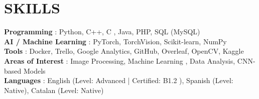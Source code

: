 \documentclass[letterpaper,11pt]{article}
\begin{document}
%
\section{SKILLS}
 \begin{itemize}[leftmargin=0in, label={}]
    \small{\item{
     \textbf{Programming} {: Python, C++, C , Java, PHP, SQL (MySQL)} \\
     \textbf{AI / Machine Learning} {: PyTorch, TorchVision, Scikit-learn, NumPy} \\
     \textbf{Tools}     {: Docker, Trello, Google Analytics, GitHub, Overleaf, OpenCV, Kaggle} \vspace{2pt} \\
     \textbf{Areas of Interest}     {: Image Processing, Machine Learning , Data Analysis, CNN-based Models} \\
     \textbf{Languages} {: English (Level: Advanced | Certified: B1.2 ), Spanish (Level: Native), Catalan (Level: Native)}
    }}
 \end{itemize}


\end{document}
